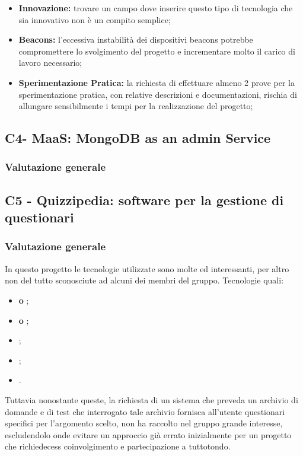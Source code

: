 \begin{itemize}
	\item \textbf{Innovazione:} trovare un campo dove inserire questo tipo di tecnologia che sia innovativo non è un compito semplice;
\end{itemize}

\begin{itemize}
	\item \textbf{Beacons:} l'eccessiva instabilità dei dispositivi beacons potrebbe compromettere lo svolgimento del progetto e incrementare molto il carico di lavoro necessario;
\end{itemize}

\begin{itemize}
	\item \textbf{Sperimentazione Pratica:} la richiesta di effettuare almeno 2 prove per la sperimentazione pratica, con relative descrizioni e documentazioni, rischia di allungare sensibilmente i tempi per la realizzazione del progetto;
\end{itemize}



\subsection{C4- MaaS: MongoDB as an admin Service}
\subsubsection{Valutazione generale}



\subsection{C5 - Quizzipedia: software per la gestione di questionari}
\subsubsection{Valutazione generale}
In questo progetto le tecnologie utilizzate sono molte ed interessanti, per altro non del tutto sconosciute ad alcuni dei membri del gruppo.
Tecnologie quali:
 \begin{itemize}
	\item \textbf{ o };
	\item\textbf{ o };
	\item \textbf{};
	\item \textbf{};
	\item \textbf{}.
\end{itemize}
Tuttavia nonostante queste, la richiesta di un sistema che preveda un archivio di domande e di test che interrogato tale archivio fornisca all'utente questionari specifici per l'argomento scelto, non ha raccolto nel gruppo grande interesse, escludendolo onde evitare un approccio gi\`a errato inizialmente per un progetto che richiedecess coinvolgimento e partecipazione a tuttotondo.

